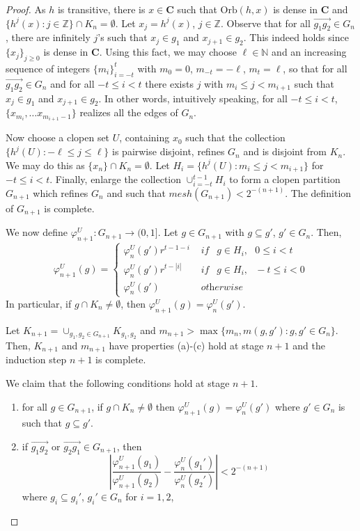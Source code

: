 \documentclass[11pt]{amsart}
\newcommand{\N}{\mathbb{N}}  %
\newcommand{\Z}{\mathbb{Z}}  %
\newcommand{\oa}{\overrightarrow}
\newcommand{\cantor}{\mathbf C}
\newcommand{\orb}{{\mathrm{Orb}}}
\newcommand{\cF}{\mathcal{F}}
\newcommand{\fsystem}{\{(G_n, \Psi_n,\varphi^L_n,\varphi^U_n)\}_{n=0}^{\infty}}
\begin{document}
{\begin{proof}
As $h$ is transitive, there is $x \in \cantor$ such that $\orb(h,x)$ is dense in $\cantor$ and  $\{h^j(x): j \in \Z \} \cap K_n = \emptyset$. Let $x_j = h^j(x)$, $j \in \Z$.
Observe that for all $\oa{g_1g_2} \in G_n$, there are infinitely $j$'s  such that $x_j \in g_1$ and $x_{j+1} \in g_2$. This indeed holds since $\{x_j\}_{j \ge 0}$ is dense in $\cantor$. Using this fact, we may choose $\ell\in \N$ and an increasing sequence of integers $\{m_i\}_{i=-t}^t$ with $m_0 =0$,   $m_{-t} = -\ell$, $m_t = \ell$,  so that for all    $\oa{g_1g_2} \in G_n$ and for all $-t \le i < t$  there exists $j$ with $m_i \le j < m_{i+1}$ such that $x_j \in g_1$ and $x_{j+1} \in g_2$. In other words, intuitively speaking, for all $-t \le i < t$, $\{x_{m_i}, \ldots x_{m_{i+1}-1}\}$ realizes all the edges of $G_n$.
     
 Now choose  a clopen set $U$, containing $x_0$ such that the collection $\{h^j(U):-\ell \le j \le \ell \}$ is pairwise disjoint, refines $G_n$ and is disjoint from $K_n$. We may do this as $\{x_n\} \cap K_n = \emptyset$. Let $H_i =\{h^j(U): m_i \le j <m_{i+1} \}$ for $-t \leq i<t$. Finally, enlarge the collection $\cup_{i=-t}^{t-1}H_i$ to form a clopen partition $G_{n+1}$ which refines $G_n$ and such that $mesh (G_{n+1})< 2^{-(n+1)}$. The definition of $G_{n+1}$ is complete.
 
    We now define $\varphi^U_{n+1}: G_{n+1} \rightarrow (0,1]$. Let $g \in G_{n+1}$ with $g \subseteq g'$, $g' \in G_n$. Then,
    \[ \varphi^U_{n+1}(g) = \begin{cases} 
          \varphi^U_n(g') r^{t-1-i }&  \textit { if }  \ \ g \in H_{i},\ \ \ 
           0 \le i < t  \ \ \ \\
           \varphi^U_n(g') r^{t-|i| }&  \textit { if }  \ \ g \in H_{i},  \ \ \ 
           -t \le i < 0 \\
          \varphi^U_n(g')  & \textit{ otherwise }
       \end{cases}
    \]
    In particular, if $g \cap K_n  \neq \emptyset$, then $ \varphi^U_{n+1}(g)= \varphi^U_n(g')$.

  Let  $K_{n+1} = \cup_{g_1,g_2 \in  G_{n+1}} K_{g_1,g_2}$ and $m_{n+1} > \max\{m_n, m(g,g'): g,g' \in G_n \}$. Then, $K_{n+1}$ and $m_{n+1}$ have properties (a)-(c) hold at stage $n+1$ and the induction step $n+1$ is complete. 

We claim that the following conditions hold at stage $n+1$.
    \begin{enumerate}
        \item for all $ g\in G_{n+1}$, if $g\cap K_n \neq \emptyset$ then $\varphi^U_{n+1}(g) = \varphi^U_{n}(g') $
        where $g' \in G_n$ is such that $g \subseteq g'$.
        \item if $\oa{g_1g_2}$ or  $\oa{g_2g_1}\in G_{n+1}$, then 
        \[  \left | \frac{\varphi^U_{n+1}(g_1)}{\varphi^U_{n+1}(g_2)}  -\frac{\varphi^U_n(g_1')}{\varphi^U_n(g_2')}\right | < 2^{-(n+1)}
        \]
        where $g_i \subseteq g_i'$, $g_i' \in G_n$ for $i=1,2$,
 

\end{enumerate}
\end{proof}}
\end{document}
